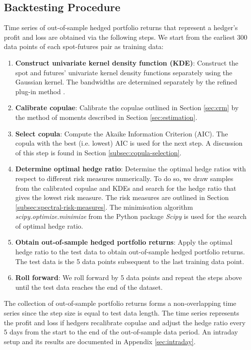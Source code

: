 \subsection{Backtesting Procedure}\label{sec:empirical-procedure}
Time series of out-of-sample hedged portfolio returns that represent a hedger's profit and loss are obtained via the following steps.
We start from the earliest 300 data points of each spot-futures pair as training data:
\begin{enumerate}
\item \textbf{Construct univariate kernel density function (KDE)}:
  Construct the spot and futures' univariate kernel density functions separately
  using the Gaussian kernel. The bandwidths are determined separately by the refined plug-in method \citep[Section
  3.3.3]{hardle2004nonparametric}.
\item \textbf{Calibrate copulae}:
  Calibrate the copulae outlined in Section \ref{sec:crm} by the
  method of moments described in Section \ref{sec:estimation}.
\item \textbf{Select copula}:
  Compute the Akaike Information Criterion (AIC). The copula with the
  best (i.e. lowest) AIC is used for the next step. 
  A discussion of this step is found in Section \ref{subsec:copula-selection}.
\item \textbf{Determine optimal hedge ratio}:
  Determine the optimal hedge ratios with respect to different
  risk measures numerically. 
  To do so, we draw samples from the calibrated copulae and KDEs 
  and search for the hedge ratio that gives the lowest risk measure. 
  The risk measures are outlined in Section \ref{subsec:spectral-risk-measures}.
  The minimisation algorithm \textit{scipy.optimize.minimize} from the Python package {\em Scipy} \citep{2020SciPy-NMeth} is used for the search of optimal hedge ratio.
\item \textbf{Obtain out-of-sample hedged portfolio returns}: Apply the optimal hedge ratio to the test data to obtain out-of-sample hedged portfolio returns.
      The test data is the 5 data points subsequent to the last training data point. 
\item \textbf{Roll forward}: We roll forward by 5 data points and repeat the steps above until the test data reaches the end of the dataset.
\end{enumerate}

The collection of out-of-sample portfolio returns forms a non-overlapping time series since the step size is equal to test data length.
The time series represents the profit and loss if hedgers recalibrate copulae and adjust the hedge ratio every 5 days from the start to the end of the out-of-sample data period.
An intraday setup and its results are documented in Appendix \ref{sec:intraday}. 

